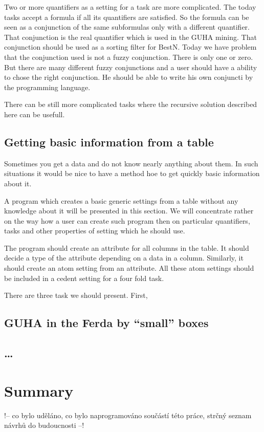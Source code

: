 \documentclass[a4paper,12pt]{book}
\begin{document}
Two or more quantifiers as a setting for a task are more complicated. The today tasks accept a formula if all its quantifiers are satisfied. So the formula can be seen as a conjunction of the same subformulas only with a different quantifier. That conjunction is the real quantifier which is used in the GUHA mining. That conjunction should be used as a sorting filter for BestN. Today we have problem that the conjunction used is not a fuzzy conjunction. There is only one or zero. But there are many different fuzzy conjunctions and a user should have a ability to chose the right conjunction. He should be able to write his own conjuncti by the programming language.

There can be still more complicated tasks where the recursive solution described here can be usefull. 

\section{Getting basic information from a table}
Sometimes you get a data and do not know nearly anything about them. In such situations it would be nice to have a method hoe to get quickly basic information about it.

A program which creates a basic generic settings from a table without any knowledge about it will be presented in this section. We will concentrate rather on the way how a user can create such program then on particular quantifiers, tasks and other properties of setting which he should use.

The program should create an attribute for all columns in the table. It should decide a type of the attribute depending on a data in a column. Similarly, it should create an atom setting from an attribute. All these atom settings should be included in a cedent setting for a four fold task.

There are three task we should present. First, 

\section{GUHA in the Ferda by ``small'' boxes}

\section{\dots}
\chapter{Summary}
!-- co bylo uděláno, co bylo naprogramováno součástí této práce, strčný seznam návrhů do budoucnosti --!
\end{document}

